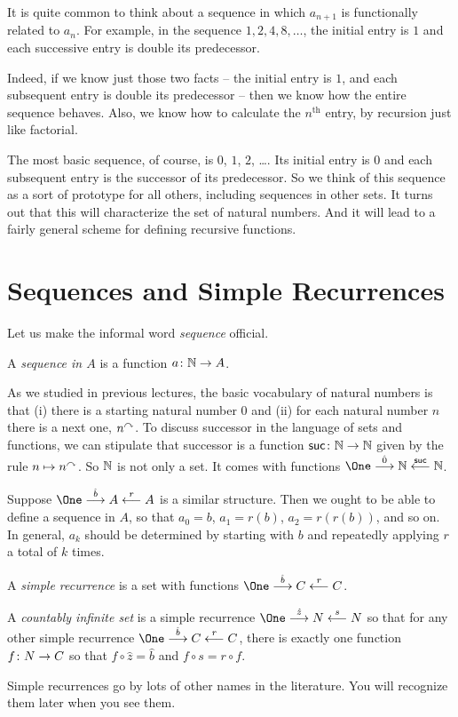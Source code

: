 It is quite common to think about a sequence in which $a_{n+1}$ is functionally related to $a_n$. 
For example, in the sequence $1, 2, 4, 8,\ldots$, the initial entry is $1$ and each successive entry is double its predecessor.

Indeed, if we know just those two facts -- the initial entry is $1$, and each subsequent entry is double its predecessor -- then we know how the entire sequence behaves.
Also, we know how to calculate the $n^{\text{th}}$ entry, by recursion just like factorial.

The most basic sequence, of course, is $0$, $1$, $2$, \ldots. 
Its initial entry is $0$ and each subsequent entry is the successor of its predecessor. 
So we think of this sequence as a sort of prototype for all others, including sequences in other sets. 
It turns out that this will characterize the set of natural numbers. And it will lead to a fairly general scheme for defining recursive functions.

\section{Sequences and Simple Recurrences}

Let us make the informal word \emph{sequence} official.

\begin{defn}
	A \emph{sequence in $A$} is a function ${a}\colon{\mathbb N}\to{A}$.
\end{defn}

As we studied in previous lectures, the basic vocabulary of natural numbers is that (i) there is a starting natural number $0$ and (ii) for each natural number $n$ there is a next one, $n^\curvearrowright$. 
To discuss successor in the language of sets and functions, we can stipulate that successor is a function ${\mathord{\textsf{suc}}}\colon{\mathbb N}\to{\mathbb N}$ given by the rule $n\mapsto n^\curvearrowright$.
So $\mathbb N$ is not only a set. 
It comes with functions $\One \stackrel{\hat{0}}{\longrightarrow} \NN \stackrel{\suc}{\longleftarrow} \NN$.

Suppose $\One\stackrel{\hat{b}}{\longrightarrow}A\stackrel{r}{\longleftarrow}A$ is a similar structure.
Then we ought to be able to define a sequence in $A$, so that $a_0=b$, $a_1=r(b)$, $a_2=r(r(b))$, and so on. 
In general, $a_k$ should be determined by starting with $b$ and repeatedly applying $r$ a total of $k$ times. 

\begin{defn}\label{def:nno}
	A \emph{simple recurrence} is a set with functions $\One\stackrel{\hat{b}}{\longrightarrow}C\stackrel{r}{\longleftarrow}C$.
	
	A \emph{countably infinite set} is a simple recurrence $\One\stackrel{\hat{z}}{\longrightarrow}N\stackrel{s}{\longleftarrow}N$ so that for any other simple recurrence $\One\stackrel{\hat{b}}{\longrightarrow}C\stackrel{r}{\longleftarrow}C$, there is exactly one function ${f}\colon{N}\to{C}$ so that $f\circ \hat{z} =\hat b$ and $f\circ s = r\circ f$.
	
	Simple recurrences go by lots of other names in the literature. You will recognize them later when you see them.
\end{defn}

